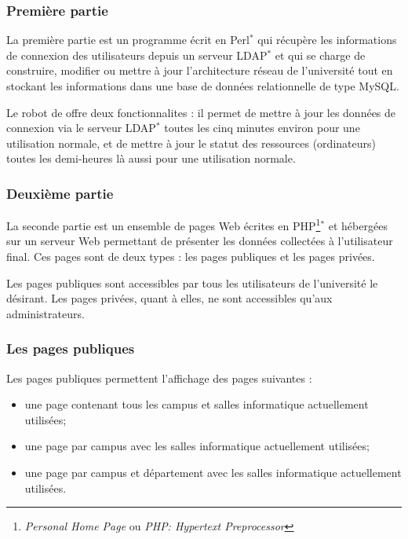 \subsubsection{Premi\`ere partie}

La premi\`ere partie est un programme \'ecrit en Perl$^*$ qui r\'ecup\`ere les informations de connexion des utilisateurs depuis un serveur LDAP$^*$ et qui se charge de construire, modifier ou mettre \`a jour l'architecture r\'eseau de l'universit\'e tout en stockant les informations dans une base de donn\'ees relationnelle de type MySQL.

Le robot de \Yuukou{} offre deux fonctionnalites : il permet de mettre \`a jour les donn\'ees de connexion via le serveur LDAP$^*$ toutes les cinq minutes environ pour une utilisation normale, et de mettre \`a jour le statut des ressources (ordinateurs) toutes les demi-heures l\`a aussi pour une utilisation normale.

\subsubsection{Deuxi\`eme partie}

La seconde partie est un ensemble de pages Web \'ecrites en PHP\protect\footnote{\textit{Personal Home Page} ou \textit{PHP: Hypertext Preprocessor}}$^*$ et h\'eberg\'ees sur un serveur Web permettant de pr\'esenter les donn\'ees collect\'ees \`a l'utilisateur final.
Ces pages sont de deux types : les pages publiques et les pages priv\'ees.

Les pages publiques sont accessibles par tous les utilisateurs de l'universit\'e le d\'esirant.
Les pages priv\'ees, quant \`a elles, ne sont accessibles qu'aux administrateurs.

\subsubsection{Les pages publiques}

\noindent Les pages publiques permettent l'affichage des pages suivantes :

\begin{itemize}
	\item une page contenant tous les campus et salles informatique actuellement utilis\'ees;
	\item une page par campus avec les salles informatique actuellement utilis\'ees;
	\item une page par campus et d\'epartement avec les salles informatique actuellement utilis\'ees.

\end{itemize}

